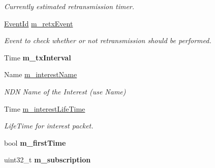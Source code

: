 \begin{DoxyCompactItemize}
\begin{DoxyCompactList}\small\item\em Currently estimated retransmission timer. \end{DoxyCompactList}\item 
\hyperlink{classEventId}{Event\+Id} \hyperlink{classns3_1_1ndn_1_1Subscriber_a11afb56a7bcfff8053b8d70e97f9d548}{m\+\_\+retx\+Event}\hypertarget{classns3_1_1ndn_1_1Subscriber_a11afb56a7bcfff8053b8d70e97f9d548}{}\label{classns3_1_1ndn_1_1Subscriber_a11afb56a7bcfff8053b8d70e97f9d548}

\begin{DoxyCompactList}\small\item\em Event to check whether or not retransmission should be performed. \end{DoxyCompactList}\item 
Time {\bfseries m\+\_\+tx\+Interval}\hypertarget{classns3_1_1ndn_1_1Subscriber_ac8b6e246ff574a42b171bee41b5bec3a}{}\label{classns3_1_1ndn_1_1Subscriber_ac8b6e246ff574a42b171bee41b5bec3a}

\item 
Name \hyperlink{classns3_1_1ndn_1_1Subscriber_a61a25e6264a43f40772619a47402fdce}{m\+\_\+interest\+Name}\hypertarget{classns3_1_1ndn_1_1Subscriber_a61a25e6264a43f40772619a47402fdce}{}\label{classns3_1_1ndn_1_1Subscriber_a61a25e6264a43f40772619a47402fdce}

\begin{DoxyCompactList}\small\item\em N\+DN Name of the Interest (use Name) \end{DoxyCompactList}\item 
Time \hyperlink{classns3_1_1ndn_1_1Subscriber_ad164ef812873c4f61823527f29ed835a}{m\+\_\+interest\+Life\+Time}\hypertarget{classns3_1_1ndn_1_1Subscriber_ad164ef812873c4f61823527f29ed835a}{}\label{classns3_1_1ndn_1_1Subscriber_ad164ef812873c4f61823527f29ed835a}

\begin{DoxyCompactList}\small\item\em Life\+Time for interest packet. \end{DoxyCompactList}\item 
bool {\bfseries m\+\_\+first\+Time}\hypertarget{classns3_1_1ndn_1_1Subscriber_a01a5146e8ac0bab2d8e6676d442dce8c}{}\label{classns3_1_1ndn_1_1Subscriber_a01a5146e8ac0bab2d8e6676d442dce8c}

\item 
uint32\+\_\+t {\bfseries m\+\_\+subscription}\hypertarget{classns3_1_1ndn_1_1Subscriber_aa36c66f276ebe6e6188dac28977d1499}{}\label{classns3_1_1ndn_1_1Subscriber_aa36c66f276ebe6e6188dac28977d1499}


\end{DoxyCompactItemize}

